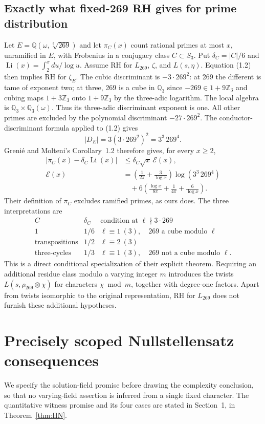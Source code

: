 \documentclass[11pt]{article}
\newcommand{\Q}{\mathbb Q}
\newcommand{\Z}{\mathbb Z}
\newcommand{\Li}{\operatorname{Li}}
\begin{document}
\subsection{Exactly what fixed-269 RH gives for prime distribution}
Let $E=\Q(\omega,\sqrt[3]{269})$ and let $\pi_C(x)$ count rational
primes at most $x$, unramified in $E$, with Frobenius in a conjugacy
class $C\subset S_3$. Put $\delta_C=|C|/6$ and
$\Li(x)=\int_2^xdu/\log u$. Assume RH for $L_{269}$, $\zeta$, and
$L(s,\eta)$. Equation (1.2) then implies RH for $\zeta_E$.
The cubic discriminant is $-3\cdot269^2$: at 269 the different is
tame of exponent two; at three, 269 is a cube in $\Q_3$ since
$-269\in1+9\Z_3$ and cubing maps $1+3\Z_3$ onto $1+9\Z_3$ by
the three-adic logarithm. The local algebra is
$\Q_3\times\Q_3(\omega)$. Thus its three-adic discriminant exponent
is one. All other primes are excluded by the polynomial discriminant
$-27\cdot269^2$. The conductor-discriminant formula applied to (1.2) gives
\[
 |D_E|=3(3\cdot269^2)^2=3^3\,269^4.
\]
Greni\'e and Molteni's Corollary~1.2 therefore gives, for every $x\ge2$,
\begin{align*}
 |\pi_C(x)-\delta_C\Li(x)|
 &\le \delta_C\sqrt x\,\mathcal E(x),\\
 \mathcal E(x)
 &=\left(\frac1{2\pi}+\frac3{\log x}\right)\log(3^3\,269^4)\\
 &\quad+6\left(\frac{\log x}{8\pi}
              +\frac1{4\pi}+\frac6{\log x}\right).
                                                               \tag{2.5}
\end{align*}
Their definition of $\pi_C$ excludes ramified primes, as ours does.
The three interpretations are
\[
\begin{array}{c|c|c}
 C&\delta_C&\text{condition at }\ell\nmid3\cdot269\\ \hline
 1&1/6&\ell\equiv1\ (3),\quad269\text{ a cube modulo }\ell\\
 \text{transpositions}&1/2&\ell\equiv2\ (3)\\
 \text{three-cycles}&1/3&\ell\equiv1\ (3),\quad269\text{ not a cube modulo }\ell .
\end{array}
\]
This is a direct conditional specialization of their explicit theorem.
Requiring an additional residue class modulo a varying integer $m$
introduces the twists $L(s,\rho_{269}\otimes\chi)$ for characters
$\chi\bmod m$, together with degree-one factors.
Apart from twists isomorphic to the original representation, RH for
$L_{269}$ does not furnish these additional hypotheses.

\section{Precisely scoped Nullstellensatz consequences}
We specify the solution-field promise before drawing the complexity
conclusion, so that no varying-field assertion is inferred from a
single fixed character.
The quantitative witness promise and its four cases are stated
in Section~1, in Theorem~\ref{thm:HN}.
\end{document}
